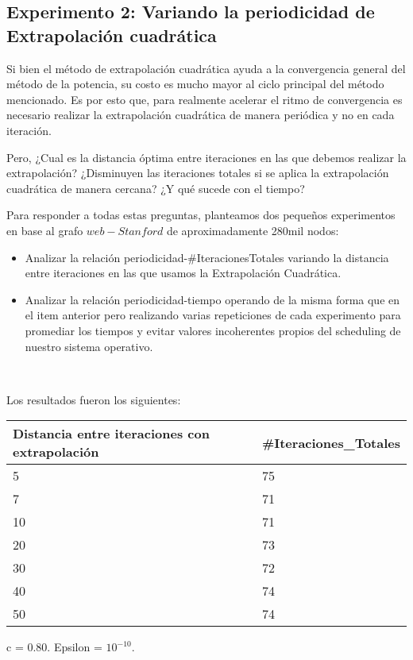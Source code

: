 \subsection{Experimento 2: Variando la periodicidad de Extrapolaci\'on cuadr\'atica}

Si bien el m\'etodo de extrapolaci\'on cuadr\'atica ayuda a la convergencia general del m\'etodo de la potencia, su costo es mucho mayor al ciclo principal del m\'etodo mencionado. Es por esto que, para realmente acelerar el ritmo de convergencia es necesario realizar la extrapolaci\'on cuadr\'atica de manera peri\'odica y no en cada iteraci\'on.

Pero, ¿Cual es la distancia \'optima entre iteraciones en las que debemos realizar la extrapolaci\'on? ¿Disminuyen las iteraciones totales si se aplica la extrapolaci\'on cuadr\'atica de manera cercana? ¿Y qu\'e sucede con el tiempo?

Para responder a todas estas preguntas, planteamos dos pequeños experimentos en base al grafo $web-Stanford$ de aproximadamente 280mil nodos:

\begin{itemize}
	\item Analizar la relaci\'on periodicidad-\#IteracionesTotales variando la distancia entre iteraciones en las que usamos la Extrapolaci\'on Cuadr\'atica.
	\item Analizar la relaci\'on periodicidad-tiempo operando de la misma forma que en el item anterior pero realizando varias repeticiones de cada experimento para promediar los tiempos y evitar valores incoherentes propios del scheduling de nuestro sistema operativo.
\end{itemize}

~

Los resultados fueron los siguientes:

\begin{center}
    \small{
    \begin{tabular}{| l | l |}
    \hline
    Distancia entre iteraciones con extrapolaci\'on & \#Iteraciones\_Totales \\ \hline
    5 & 75 \\ \hline
    7 & 71 \\ \hline
    10 & 71 \\ \hline
    20 & 73 \\ \hline
    30 & 72 \\ \hline
    40 & 74 \\ \hline
    50 & 74 \\ \hline

    \end{tabular}
    }
\end{center}
\begin{center}
c = 0.80. Epsilon = $10^{-10}$.
\end{center}

